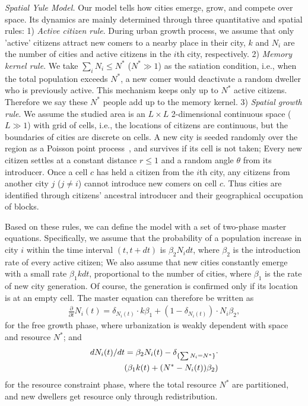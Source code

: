 \documentclass[reprint,unsortedaddress,amsmath,amssymb,aps,prl,showkeys]{revtex4-2}
\begin{document}
\textit{Spatial Yule Model.} Our model tells how cities emerge, grow, and compete over space. Its dynamics are mainly determined through three quantitative and spatial rules: 1) \textit{Active citizen rule}. During urban growth process, we assume that only 'active' citizens attract new comers to a nearby place in their city, $k$ and $N_i$ are the number of cities and active citizens in the $i$th city, respectively. 2) \textit{Memory kernel rule}. We take $\sum_{i} N_i \le N^*$ ($N^* \gg 1$) as the satiation condition, i.e., when the total population exceeds $N^*$, a new comer would deactivate a random dweller who is previously active. This mechanism keeps only up to $N^*$ active citizens. Therefore we say these $N^*$ people add up to the memory kernel. 3) \emph{Spatial growth rule}. We assume the studied area is an $L\times L$ 2-dimensional continuous space ($L\gg 1$) with grid of cells, %
i.e., the locations of citizens are continuous, but the boundaries of cities are discrete on cells. A new city is seeded randomly over the region as a Poisson point process~\cite{miles1970homogeneous}, and survives if its cell is not taken; Every new citizen settles at a constant distance $r\le 1$ and a random angle $\theta$ from its introducer. Once a cell $c$ has held a citizen from the $i$th city, any citizens from another city $j$ ($j\ne i$) cannot introduce new comers on cell $c$. Thus cities are identified through citizens' ancestral introducer and their geographical occupation of blocks.

Based on these rules, we can define the model with a set of two-phase master equations. Specifically, we assume that the probability of a population increase in city $i$ within the time interval $(t,t+dt)$ is $\beta_2N_idt$, where $\beta_2$ is the introduction rate of every active citizen; We also assume that new cities constantly emerge with a small rate $\beta_1kdt$, proportional to the number of cities, where $\beta_1$ is the rate of new city generation. Of course, the generation is confirmed only if its location is at an empty cell. The master equation can therefore be written as \begin{align}\frac{\partial}{\partial t}N_i(t) =  \delta_{N_i(t)}\cdot k\beta_1+ (1-\delta_{N_i(t)})\cdot N_i\beta_2, \end{align} for the free growth phase, where urbanization is weakly dependent with space and resource $N^*$;
and \begin{align}
dN_i(t)/dt = \beta_2 N_i(t) -\delta_{\{\sum N_i = N^*\}}\cdot\notag \\ \left(\beta_1k(t) + (N^*-N_i(t))\beta_2 \right)
\end{align}
for the resource constraint phase, where the total resource $N^*$ are partitioned, and new dwellers get resource only through redistribution. 
\end{document}
